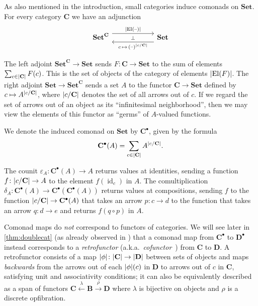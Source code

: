 \documentclass[11pt, oneside, article]{memoir}
\theoremstyle{plain}
\theoremstyle{definition}
\theoremstyle{remark}
\newenvironment{example}
{\renewcommand\qedsymbol{$\lrcorner$}%
  \pushQED{\qed}\myexample}
{\popQED\endmyexample}
\DeclareMathOperator{\id}{id}
\DeclareMathOperator{\El}{El}
\DeclarePairedDelimiter{\abs}{\lvert}{\rvert}
\newcommand{\dash}{{\mathord{\text{--}}}}
\newcommand{\xto}[1]{\xrightarrow{#1}}
\newcommand{\xot}[1]{\xleftarrow{#1}}
\newcommand{\namedcat}[1]{\mathbf{#1}}
\newcommand{\cat}[1]{\mathbf{#1}}
\newcommand{\Set}{\namedcat{Set}}
\newcommand{\pts}[1]{{\abs{#1}}}
\newcommand{\obs}[1]{\pts{#1}}
\newcommand{\one}[1]{\pts{#1}}
\newcommand{\fun}[2]{{#2}^{#1}}
\newcommand{\xA}{A}
\newcommand{\bB}{\cat{B}}
\newcommand{\bC}{\cat{C}}
\newcommand{\bD}{\cat{D}}
\newcommand{\cbC}{\cattocmd{\bC}}
\newcommand{\cbD}{\cattocmd{\bD}}
\newcommand{\cattocmd}[1]{{{#1}^\bullet}}
\begin{document}
\begin{example}[Categories]\label{ex:cat}
  As also mentioned in the introduction, small categories induce comonads on
  $\Set$. For every category $\bC$ we have an adjunction
  \[
    \begin{tikzcd}[column sep=60pt]
      \fun{\bC}{\Set}\ar[r, shift left=6pt,
      "\obs{\El(\dash)}"]\ar["\bot"{anchor=center},r, draw=none]&
      \Set\ar[l, shift left=6pt, "c \,\mapsto\, (\dash)^{\obs{c / \bC}}"]
    \end{tikzcd}
  \]

  The left adjoint $\fun{\bC}{\Set} \to \Set$ sends
  $F \colon \bC \to \Set$ to the sum of elements
  $\sum_{c\in \obs{\bC}} F(c)$. This is the set of objects of the
  category of elements $\obs{\El(F)}$. The right adjoint
  $\Set \to \fun{\bC}{\Set}$ sends a set $\xA$ to the functor $\bC \to \Set$
  defined by $c \mapsto \xA^{\obs{c / \bC}}$, where $\obs{c / \bC}$ denotes
  the set of all arrows out of $c$. If we regard the set of arrows out
  of an object as its ``infinitesimal neighborhood'', then we may view
  the elements of this functor as ``germs'' of $\xA$-valued functions.

  We denote the induced comonad on $\Set$ by $\cbC$, given
  by the formula
  \[\cbC(\xA) = \sum_{c\in \obs{\bC}} \xA^{\obs{c / \bC}}.\]

  The counit $\varepsilon_\xA \colon \cbC(\xA) \to \xA$ returns
  values at identities, sending a function
  $f \colon \obs{c / \bC} \to \xA$ to the element $f(\id_{c})$ in
  $\xA$. The comultiplication
  $\delta_\xA \colon \cbC(\xA) \to
  \cbC(\cbC(\xA))$ returns values at compositions,
  sending $f$ to the function $\obs{c / \bC} \to \cbC(\xA)$
  that takes an arrow $p \colon c \to d$ to the function that takes an
  arrow $q \colon d \to e$ and returns $f(q \circ p)$ in $\xA$.


  Comonad maps do \emph{not} correspond to functors of categories. We
  will see later in \cref{thm:doublecat} (as already observed in
  \cite{ahman-uustalu:updates}) that a comonad map from
  $\cbC$ to $\cbD$ instead corresponds to a
  \emph{retrofunctor} (a.k.a.\
  \emph{cofunctor}~\cite{higgins-mackenzie,aguiar,dimeglio:lenses,ahman-uustalu:updates,niu-spivak})
  from $\bC$ to $\bD$. A retrofunctor consists of a map
  $\one{\phi} \colon \obs{\bC} \to \obs{\bD}$ between sets of objects
  and maps \emph{backwards} from the arrows out of each
  $\one{\phi}(c)$ in $\bD$ to arrows out of $c$ in $\bC$, satisfying
  unit and associativity conditions; it can also be equivalently
  described as a span of functors
  $\bC \xot{\lambda} \bB \xto{\rho} \bD$ where $\lambda$ is bijective
  on objects and $\rho$ is a discrete opfibration.
\end{example}
\end{document}
